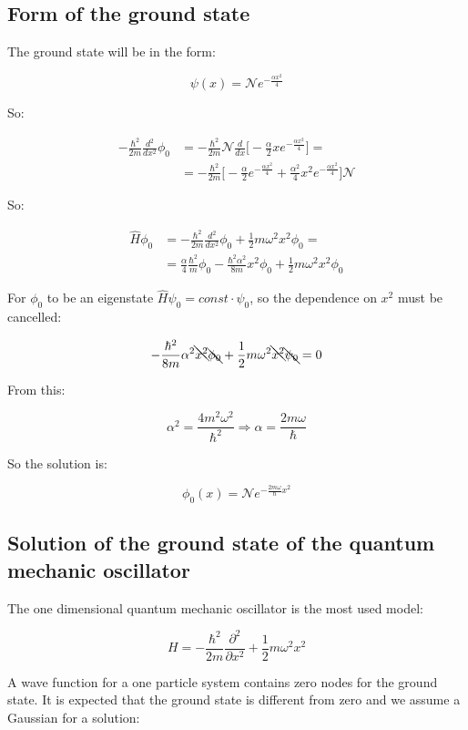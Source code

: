   \subsection{Form of the ground state}
  The ground state will be in the form:

  $$\psi(x) = \mathcal{N}e^{-\frac{\alpha x^2}{4}}$$

  So:

  \begin{align*}
    -\frac{\hbar^2}{2m}\frac{d{^2}}{d{x^2}}\phi_0 &= -\frac{\hbar^2}{2m}\mathcal{N}\frac{d{}}{d{x}}\biggl[-\frac{\alpha}{2}xe^{-\frac{\alpha x^2}{4}}\biggr]=\\
                                                  &= -\frac{\hbar^2}{2m}\biggl[-\frac{\alpha}{2}e^{-\frac{\alpha x^2}{4}}+\frac{\alpha^2}{4}x^2e^{-\frac{\alpha x^2}{4}}\biggr]\mathcal{N}
  \end{align*}

  So:

  \begin{align*}
    \hat{H}\phi_0 &= -\frac{\hbar^2}{2m}\frac{d{^2}}{d{x^2}}\phi_0 + \frac{1}{2}m\omega^2x^2\phi_0=\\
                  &= \frac{\alpha}{4}\frac{\hbar^2}{m}\phi_0 -\frac{\hbar^2\alpha^2}{8m}x^2\phi_0 + \frac{1}{2}m\omega^2x^2\phi_0
  \end{align*}

  For $\phi_0$ to be an eigenstate $\hat{H}\psi_0 = const\cdot\psi_0$, so the dependence on $x^2$ must be cancelled:

  $$-\frac{\hbar^2}{8m}\alpha^2\bcancel{x^2}\bcancel{\phi_0} + \frac{1}{2}m\omega^2\bcancel{x^2}\bcancel{\psi_0} = 0$$

  From this:

  $$\alpha^2 = \frac{4m^2\omega^2}{\hbar^2}\Rightarrow\alpha=\frac{2m\omega}{\hbar}$$

  So the solution is:

  $$\phi_0(x) = \mathcal{N}e^{-\frac{2m\omega}{\hbar}x^2}$$

  \subsection{Solution of the ground state of the quantum mechanic oscillator}
  The one dimensional quantum mechanic oscillator is the most used model:

  $$H = -\frac{\hbar^2}{2m}\frac{\partial^2}{\partial x^2} + \frac{1}{2}m\omega^2x^2$$

  A wave function for a one particle system contains zero nodes for the ground state.
  It is expected that the ground state is different from zero and we assume a Gaussian for a solution:

